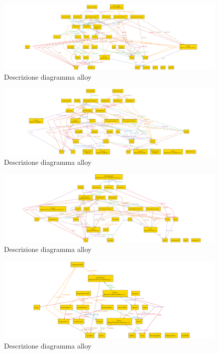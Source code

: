 \begin{figure} [H]
	\includegraphics[width=\linewidth]{../Alloy/book.png}
	\caption{Descrizione diagramma alloy}
	\label{fig:AlloyTag2}
\end{figure}

\begin{figure} [H]
	\includegraphics[width=\linewidth]{../Alloy/exitStore.png}
	\caption{Descrizione diagramma alloy}
	\label{fig:AlloyTag3}
\end{figure}

\begin{figure} [H]
	\includegraphics[width=\linewidth]{../Alloy/getQuickTicket.png}
	\caption{Descrizione diagramma alloy}
	\label{fig:AlloyTag4}
\end{figure}

\begin{figure} [H]
	\includegraphics[width=\linewidth]{../Alloy/hasTicketForThisStore.png}
	\caption{Descrizione diagramma alloy}
	\label{fig:AlloyTag5}
\end{figure}

